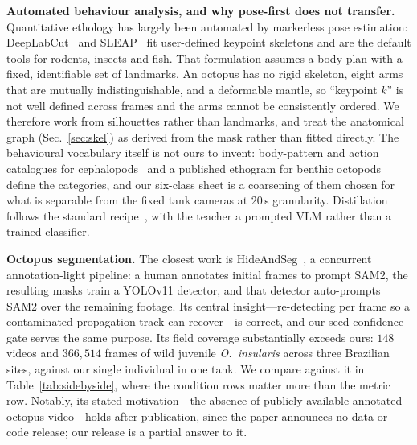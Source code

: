 \documentclass[conference]{IEEEtran}
\begin{document}
\textbf{Automated behaviour analysis, and why pose-first does not transfer.}
Quantitative ethology has largely been automated by markerless pose estimation:
DeepLabCut~\cite{deeplabcut} and SLEAP~\cite{sleap} fit user-defined keypoint
skeletons and are the default tools for rodents, insects and fish. That
formulation assumes a body plan with a fixed, identifiable set of landmarks. An
octopus has no rigid skeleton, eight arms that are mutually
indistinguishable, and a deformable mantle, so ``keypoint $k$'' is not
well defined across frames and the arms cannot be consistently ordered. We
therefore work from silhouettes rather than landmarks, and treat the anatomical
graph (Sec.~\ref{sec:skel}) as derived from the mask rather than fitted
directly. The behavioural vocabulary itself is not ours to invent: body-pattern
and action catalogues for cephalopods~\cite{borrelli} and a published ethogram
for benthic octopods~\cite{mather} define the categories, and our six-class
sheet is a coarsening of them chosen for what is separable from the
fixed tank cameras at $20$\,s granularity. Distillation follows the standard
recipe~\cite{hinton}, with the teacher a prompted VLM rather than a trained
classifier.

\textbf{Octopus segmentation.} The closest work is
HideAndSeg~\cite{hideandseg}, a concurrent annotation-light pipeline: a human
annotates initial frames to prompt SAM2, the resulting masks train a YOLOv11
detector, and that detector auto-prompts SAM2 over the remaining footage. Its
central insight---re-detecting per frame so a contaminated propagation track can
recover---is correct, and our seed-confidence gate serves the same purpose. Its
field coverage substantially exceeds ours: $148$ videos and $366{,}514$ frames of
wild juvenile \emph{O.\ insularis} across three Brazilian sites, against our
single individual in one tank. We compare against it in
Table~\ref{tab:sidebyside}, where the condition rows matter more than the metric
row. Notably, its stated motivation---the absence of publicly available
annotated octopus video---holds after publication, since the paper announces no
data or code release; our release is a partial answer to it.
\end{document}
